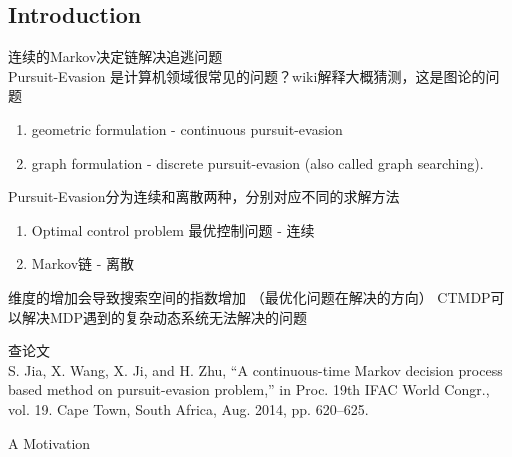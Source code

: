 \documentclass[
10pt, %
a4paper, %
onecolumn, %
portrait %
]{article}
\begin{document}
\begin{CJK*}{UTF8}{gbsn}
\pagestyle{myheadings} %
\markright{\doctitle} %


\thispagestyle{plain} %

\printtitle %


\section*{Introduction} %

连续的Markov决定链解决追逃问题
\\ Pursuit-Evasion 是计算机领域很常见的问题？wiki解释大概猜测，这是图论的问题

\begin{enumerate}
\item  geometric formulation - continuous pursuit-evasion
\item graph formulation - discrete pursuit-evasion (also called graph searching). 
\end{enumerate}

Pursuit-Evasion分为连续和离散两种，分别对应不同的求解方法

\begin{enumerate}
\item Optimal  control  problem 最优控制问题 - 连续
\item Markov链 - 离散
\end{enumerate}

维度的增加会导致搜索空间的指数增加 （最优化问题在解决的方向）
CTMDP可以解决MDP遇到的复杂动态系统无法解决的问题

查论文
 \\ S. Jia, X. Wang, X. Ji, and H. Zhu, “A continuous-time Markov decision process based method on pursuit-evasion problem,” in Proc. 19th
 IFAC   World   Congr.,   vol.   19.   Cape   Town,   South   Africa,   Aug.   2014, pp. 620–625.


A  Motivation


\end{CJK*}
\end{document}
